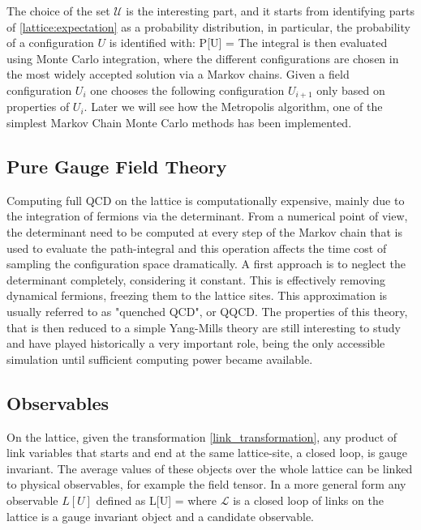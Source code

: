 The choice of the set $\mathcal{U}$ is the interesting part, and it starts from identifying parts of \ref{lattice:expectation} as a probability distribution, in particular, the probability of a configuration $U$ is identified with:
\beq
    P[U] = 
\eeq 
The integral is then evaluated using Monte Carlo integration, where the different configurations are chosen in the most widely accepted solution via a Markov chains. Given a field configuration $U_i$ one chooses the following configuration $U_{i+1}$ only based on properties of $U_i$. Later we will see how the Metropolis algorithm, one of the simplest Markov Chain Monte Carlo methods has been implemented. 

\subsection{Pure Gauge Field Theory}
Computing full QCD on the lattice is computationally expensive, mainly due to the integration of fermions via the determinant. From a numerical point of view, the determinant need to be computed at every step of the Markov chain that is used to evaluate the path-integral and this operation affects the time cost of sampling the configuration space dramatically. A first approach is to neglect the determinant completely, considering it constant. This is effectively removing dynamical fermions, freezing them to the lattice sites. This approximation is usually referred to as "quenched QCD", or QQCD. The properties of this theory, that is then reduced to a simple Yang-Mills theory are still interesting to study and have played historically a very important role, being the only accessible simulation until sufficient computing power became available.

\subsection{Observables}
On the lattice, given the transformation \ref{link_transformation}, any product of link variables that starts and end at the same lattice-site, a closed loop, is gauge invariant. The average values of these objects over the whole lattice can be linked to physical observables, for example the field tensor. In a more general form any observable $L[U]$ defined as
\beq
    L[U] = \Tr {}
\eeq
where $\mathcal{L}$ is a closed loop of links on the lattice is a gauge invariant object and a candidate observable. 

